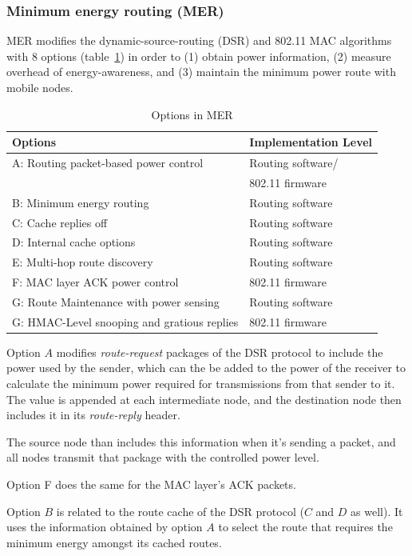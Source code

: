 \documentclass[conference]{IEEEtran}
\begin{document}
\subsubsection{Minimum energy routing (MER)}
MER\cite{doshi2002demand} modifies the dynamic-source-routing (DSR)\cite{johnson1996dynamic}
and 802.11 MAC algorithms\cite{woesner1998power} with 8 options (table~\ref{tbl:mer-options}) in order to
(1) obtain power information, (2) measure overhead of energy-awareness, and
(3) maintain the minimum power route with mobile nodes.

\begin{table}[tb]
  \begin{tabular}{ll}
    Options & Implementation Level  \\
    \hline
    A: Routing packet-based power control & Routing software/\\ &802.11 firmware \\
    B: Minimum energy routing & Routing software \\
    C: Cache replies off & Routing software \\
    D: Internal cache options & Routing software \\
    E: Multi-hop route discovery & Routing software \\
    F: MAC layer ACK power control & 802.11 firmware \\
    G: Route Maintenance with power sensing & Routing software \\
    G: HMAC-Level snooping and gratious replies & 802.11 firmware \\
  \end{tabular}
  \caption{Options in MER}
  \label{tbl:mer-options}
\end{table}

Option $A$ modifies \textit{route-request} packages of the DSR protocol to
include the power used by the sender, which can the be added to the power
of the receiver to calculate the minimum power required for transmissions
from that sender to it. The value is appended at each intermediate node, and the
destination node then includes it in its \textit{route-reply} header.

The source node than includes this information when it's sending a packet, and
all nodes transmit that package with the controlled power level.

Option F does the same for the MAC layer's ACK packets.

Option $B$ is related to the route cache of the DSR protocol ($C$ and $D$ as well). It
uses the information obtained by option $A$ to select the route that requires
the minimum energy amongst its cached routes.
\end{document}
